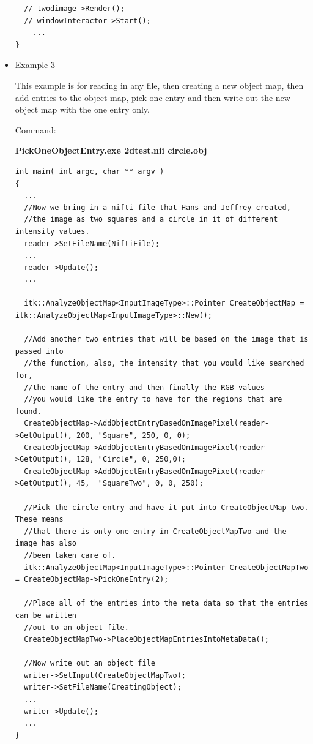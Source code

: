 \documentclass{InsightArticle}
\begin{document}
\begin{itemize}
\begin{verbatim}
  // twodimage->Render();
  // windowInteractor->Start();
	...
}
\end{verbatim} \normalsize
                                                                               
\item Example 3

This example is for reading in any file, then creating a new object map, then add entries to the object map, pick one entry and then write out the new object map with the one entry only.

Command:

\textbf{PickOneObjectEntry.exe 2dtest.nii circle.obj}

\small \begin{verbatim}
int main( int argc, char ** argv )
{
  ...
  //Now we bring in a nifti file that Hans and Jeffrey created, 
  //the image as two squares and a circle in it of different intensity values.
  reader->SetFileName(NiftiFile);
  ...
  reader->Update();
  ...
  
  itk::AnalyzeObjectMap<InputImageType>::Pointer CreateObjectMap = itk::AnalyzeObjectMap<InputImageType>::New();
  
  //Add another two entries that will be based on the image that is passed into 
  //the function, also, the intensity that you would like searched for, 
  //the name of the entry and then finally the RGB values
  //you would like the entry to have for the regions that are found.
  CreateObjectMap->AddObjectEntryBasedOnImagePixel(reader->GetOutput(), 200, "Square", 250, 0, 0);
  CreateObjectMap->AddObjectEntryBasedOnImagePixel(reader->GetOutput(), 128, "Circle", 0, 250,0);
  CreateObjectMap->AddObjectEntryBasedOnImagePixel(reader->GetOutput(), 45,  "SquareTwo", 0, 0, 250);
  
  //Pick the circle entry and have it put into CreateObjectMap two.  These means
  //that there is only one entry in CreateObjectMapTwo and the image has also
  //been taken care of.
  itk::AnalyzeObjectMap<InputImageType>::Pointer CreateObjectMapTwo = CreateObjectMap->PickOneEntry(2);
  
  //Place all of the entries into the meta data so that the entries can be written
  //out to an object file.
  CreateObjectMapTwo->PlaceObjectMapEntriesIntoMetaData();
  
  //Now write out an object file
  writer->SetInput(CreateObjectMapTwo);
  writer->SetFileName(CreatingObject);
  ...
  writer->Update();
  ...
}
\end{verbatim} \normalsize


\end{itemize}
\end{document}
